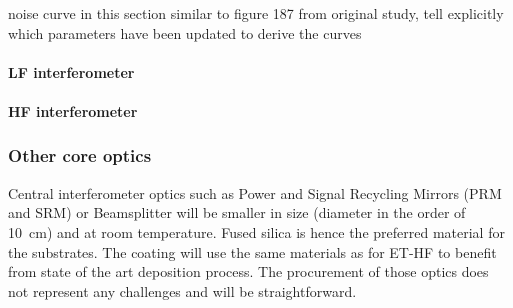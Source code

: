 noise curve in this section similar to figure 187 from original study, tell explicitly which parameters have been updated to derive the curves

\paragraph{LF interferometer}

\paragraph{HF interferometer}


\subsubsection{Other core optics}

Central interferometer optics such as Power and Signal Recycling Mirrors (PRM and SRM) or Beamsplitter will be smaller in size (diameter in the order of 10~cm) and at room temperature. Fused silica is hence the preferred material for the substrates. The coating will use the same materials as for ET-HF to benefit from state of the art deposition process. The procurement of those optics does not represent any challenges and will be straightforward.